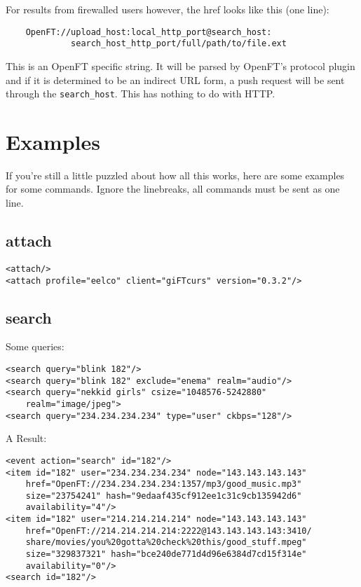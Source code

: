 \documentclass[10pt]{article}
\begin{document}
For results from firewalled users however, the href looks like this (one
line):
\begin{verbatim}
    OpenFT://upload_host:local_http_port@search_host:
             search_host_http_port/full/path/to/file.ext
\end{verbatim}
This is an OpenFT specific string. It will be parsed by OpenFT's protocol
plugin and if it is determined to be an indirect URL form, a push request will
be sent through the \verb|search_host|. This has nothing to do with HTTP.

\section{Examples}
If you're still a little puzzled about how all this works, here are some
examples for some commands. Ignore the linebreaks, all commands must be sent as
one line.

\subsection{attach}
\begin{verbatim}
<attach/>
<attach profile="eelco" client="giFTcurs" version="0.3.2"/>
\end{verbatim}

\subsection{search}
Some queries:
\begin{verbatim}
<search query="blink 182"/>
<search query="blink 182" exclude="enema" realm="audio"/>
<search query="nekkid girls" csize="1048576-5242880"
    realm="image/jpeg">
<search query="234.234.234.234" type="user" ckbps="128"/>
\end{verbatim}

A Result:
\begin{verbatim}
<event action="search" id="182"/>
<item id="182" user="234.234.234.234" node="143.143.143.143"
    href="OpenFT://234.234.234.234:1357/mp3/good_music.mp3"
    size="23754241" hash="9edaaf435cf912ee1c31c9cb135942d6"
    availability="4"/>
<item id="182" user="214.214.214.214" node="143.143.143.143"
    href="OpenFT://214.214.214.214:2222@143.143.143.143:3410/
    share/movies/you%20gotta%20check%20this/good_stuff.mpeg"
    size="329837321" hash="bce240de771d4d96e6384d7cd15f314e"
    availability="0"/>
<search id="182"/> 
\end{verbatim}
\end{document}
